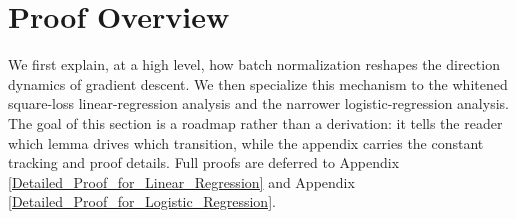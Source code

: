 \documentclass[pdflatex,sn-basic]{sn-jnl}%
\theoremstyle{thmstyleone}%
\begin{document}


\section{Proof Overview}\label{ProofOverview}

We first explain, at a high level, how batch normalization reshapes the direction dynamics of gradient descent. We then specialize this mechanism to the whitened square-loss linear-regression analysis and the narrower logistic-regression analysis. The goal of this section is a roadmap rather than a derivation: it tells the reader which lemma drives which transition, while the appendix carries the constant tracking and proof details. Full proofs are deferred to Appendix \ref{Detailed_Proof_for_Linear_Regression} and Appendix \ref{Detailed_Proof_for_Logistic_Regression}.
\end{document}

